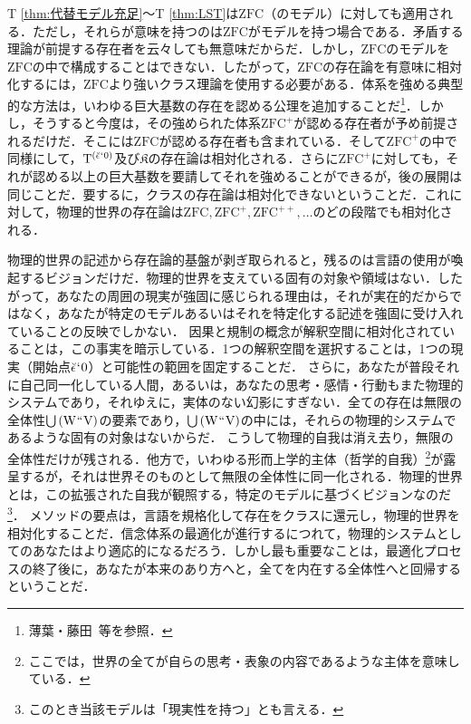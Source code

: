 T \ref{thm:代替モデル充足}〜T \ref{thm:LST}は$\mathrm{ZFC}$（のモデル）に対しても適用される．ただし，それらが意味を持つのは$\mathrm{ZFC}$がモデルを持つ場合である．矛盾する理論が前提する存在者を云々しても無意味だからだ．しかし，$\mathrm{ZFC}$のモデルを$\mathrm{ZFC}$の中で構成することはできない．したがって，$\mathrm{ZFC}$の存在論を有意味に相対化するには，$\mathrm{ZFC}$より強いクラス理論を使用する必要がある．体系を強める典型的な方法は，いわゆる巨大基数の存在を認める公理を追加することだ\footnote{
    薄葉・藤田~\cite{薄葉}等を参照．
}．しかし，そうすると今度は，その強められた体系$\mathrm{ZFC}^{+}$が認める存在者が予め前提されるだけだ．そこには$\mathrm{ZFC}$が認める存在者も含まれている．そして$\mathrm{ZFC}^{+}$の中で同様にして，$\mathrm{T}^{(\breve{\epsilon}{\mspace{1mu}{`}\mspace{1mu}} 0)}$及び$\mathfrak{K}$の存在論は相対化される．さらに$\mathrm{ZFC}^{+}$に対しても，それが認める以上の巨大基数を要請してそれを強めることができるが，後の展開は同じことだ．要するに，クラスの存在論は相対化できないということだ．これに対して，物理的世界の存在論は$ \mathrm{ZFC},\mathrm{ZFC}^{+},\mathrm{ZFC}^{++},\dots $のどの段階でも相対化される．

物理的世界の記述から存在論的基盤が剥ぎ取られると，残るのは言語の使用が喚起するビジョンだけだ．物理的世界を支えている固有の対象や領域はない．したがって，あなたの周囲の現実が強固に感じられる理由は，それが実在的だからではなく，あなたが特定のモデルあるいはそれを特定化する記述を強固に受け入れていることの反映でしかない．
因果と規制の概念が解釈空間に相対化されていることは，この事実を暗示している．1つの解釈空間を選択することは，1つの現実（開始点$ \breve{\epsilon}{\mspace{1mu}{`}\mspace{1mu}} 0 $）と可能性の範囲を固定することだ．
さらに，あなたが普段それに自己同一化している人間，あるいは，あなたの思考・感情・行動もまた物理的システムであり，それゆえに，実体のない幻影にすぎない．全ての存在は無限の全体性${\textstyle\bigcup}\mspace{3mu}(\mathrm{W}{\mspace{1mu}{``}\mspace{1mu}}\mathrm{V})$の要素であり，${\textstyle\bigcup}\mspace{3mu}(\mathrm{W}{\mspace{1mu}{``}\mspace{1mu}}\mathrm{V})$の中には，それらの物理的システムであるような固有の対象はないからだ．
こうして物理的自我は消え去り，無限の全体性だけが残される．他方で，いわゆる形而上学的主体（哲学的自我）\footnote{ここでは，世界の全てが自らの思考・表象の内容であるような主体を意味している．}が露呈するが，それは世界そのものとして無限の全体性に同一化される．物理的世界とは，この拡張された自我が観照する，特定のモデルに基づくビジョンなのだ\footnote{このとき当該モデルは「現実性を持つ」とも言える．}．
メソッドの要点は，言語を規格化して存在をクラスに還元し，物理的世界を相対化することだ．信念体系の最適化が進行するにつれて，物理的システムとしてのあなたはより適応的になるだろう．しかし最も重要なことは，最適化プロセスの終了後に，あなたが本来のあり方へと，全てを内在する全体性へと回帰するということだ．

